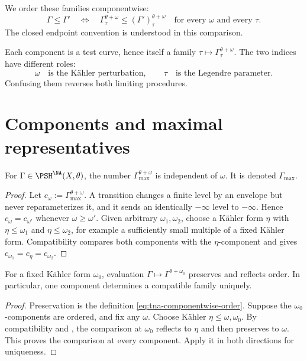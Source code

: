 We order these families componentwise:
\[
 \Gamma\leq\Gamma'
 \quad\Longleftrightarrow\quad
 \Gamma^{\theta+\omega}_\tau\leq
 (\Gamma')^{\theta+\omega}_\tau
 \quad\text{for every }\omega\text{ and every }\tau.
\tag{53.7a}\label{eq:tna-componentwise-order}
\]
The closed endpoint convention is understood in this comparison.

Each component is a test curve, hence itself a family
$\tau\mapsto\Gamma_\tau^{\theta+\omega}$.  The two indices have
different roles:
\[
 \omega\quad\text{is the K\"ahler perturbation},\qquad
 \tau\quad\text{is the Legendre parameter}.
\tag{53.8}\label{eq:tna-two-indices}
\]
Confusing them reverses both limiting procedures.

\section{Components and maximal representatives}
\label{sec:tna-components}

\begin{proposition}\label{prop:tna-common-terminal}
For $\Gamma\in\PSH^{\NA}(X,\theta)$, the number
$\Gamma^{\theta+\omega}_{\max}$ is independent of $\omega$.
It is denoted $\Gamma_{\max}$.
\end{proposition}

\begin{proof}
Let $c_\omega:=\Gamma^{\theta+\omega}_{\max}$.  A transition changes a
finite level by an envelope but never reparameterizes it, and it sends an
identically $-\infty$ level to $-\infty$.  Hence
$c_\omega=c_{\omega'}$ whenever $\omega\geq\omega'$.  Given arbitrary
$\omega_1,\omega_2$, choose a K\"ahler form $\eta$ with
$\eta\leq\omega_1$ and $\eta\leq\omega_2$, for example a sufficiently
small multiple of a fixed K\"ahler form.  Compatibility compares both
components with the $\eta$-component and gives
$c_{\omega_1}=c_\eta=c_{\omega_2}$.
\end{proof}

\begin{corollary}
\label{cor:tna-component-order}
For a fixed K\"ahler form $\omega_0$, evaluation
$\Gamma\mapsto\Gamma^{\theta+\omega_0}$ preserves and reflects order.
In particular, one component determines a compatible family uniquely.
\end{corollary}

\begin{proof}
Preservation is the definition \eqref{eq:tna-componentwise-order}.
Suppose the $\omega_0$-components are ordered, and fix any $\omega$.
Choose K\"ahler $\eta\leq\omega,\omega_0$.
By compatibility and , the comparison
at $\omega_0$ reflects to $\eta$ and then preserves to $\omega$.
This proves the comparison at every component.  Apply it in both
directions for uniqueness.
\end{proof}

